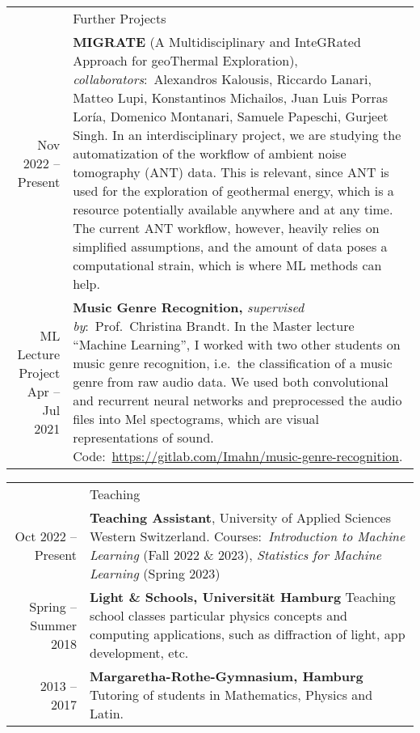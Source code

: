 \documentclass[11pt, a4paper]{article}
\newcommand{\headingfont}{\Large\color{OliveGreen}}
\newenvironment{SectionTable}[1]{
	\renewcommand*{\arraystretch}{1.7}
	\setlength{\tabcolsep}{10pt}
	\begin{longtable}{Rp{5.2in}} & #1 \\}
	{\end{longtable}\vspace{-.3cm}}
\begin{document}
	\begin{SectionTable}{\headingfont Further Projects}
		Nov 2022 -- Present & \textbf{MIGRATE} (A Multidisciplinary and InteGRated Approach for geoThermal Exploration), \textit{collaborators}:~Alexandros Kalousis, Riccardo Lanari, Matteo Lupi, Konstantinos Michailos,
        Juan Luis Porras Loría, Domenico Montanari, Samuele Papeschi, Gurjeet Singh. In an interdisciplinary project, we are studying the automatization of the workflow of ambient noise tomography (ANT) data. 
        This is relevant, since ANT is used for the exploration of geothermal energy, which is a resource potentially available anywhere and at any time. The current ANT workflow, however, heavily relies on 
        simplified assumptions, and the amount of data poses a computational strain, which is where ML methods can help.\\
        
        ML Lecture Project Apr -- Jul 2021 & \textbf{Music Genre Recognition,} \textit{supervised by}:~Prof.~Christina Brandt. In the Master lecture \enquote{Machine Learning}, I worked with two other 
        students on music genre recognition, i.e.~the classification of a music genre from raw audio data. We used both convolutional and recurrent neural networks and preprocessed the audio files into 
        Mel spectograms, which are visual representations of sound. Code:~\url{https://gitlab.com/Imahn/music-genre-recognition}.
		
	\end{SectionTable}

	\begin{SectionTable}{\headingfont Teaching}
		Oct 2022 -- Present & \textbf{Teaching Assistant}, University of Applied Sciences Western Switzerland. \newline Courses:~\textit{Introduction to Machine Learning} (Fall 2022 \& 2023), \textit{Statistics for Machine Learning} (Spring 2023) \\
		
		Spring -- Summer 2018 & 
		\textbf{Light \& Schools, Universität Hamburg} \newline
		Teaching school classes particular physics concepts and computing applications, such as diffraction of light, app development, etc.\\ 
		
		2013 -- 2017 & \textbf{Margaretha-Rothe-Gymnasium, Hamburg} \newline 
		Tutoring of students in Mathematics, Physics and Latin. 
	\end{SectionTable}
    
\end{document}
